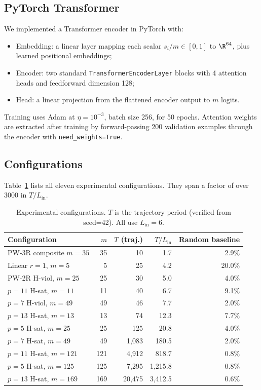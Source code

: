 \documentclass[11pt]{article}
\theoremstyle{plain}
\theoremstyle{definition}
\begin{document}
\subsection{PyTorch Transformer}

We implemented a Transformer encoder in PyTorch with:
\begin{itemize}[leftmargin=2em,itemsep=2pt]
  \item Embedding: a linear layer mapping each scalar $s_i/m \in [0,1]$ to $\R^{64}$, plus learned positional embeddings;
  \item Encoder: two standard \texttt{TransformerEncoderLayer} blocks with 4 attention heads and feedforward dimension 128;
  \item Head: a linear projection from the flattened encoder output to $m$ logits.
\end{itemize}
Training uses Adam at $\eta = 10^{-3}$, batch size 256, for 50 epochs. Attention weights are extracted after training by forward-passing 200 validation examples through the encoder with \texttt{need\_weights=True}.

\subsection{Configurations}

Table~\ref{tab:configs} lists all eleven experimental configurations. They span a factor of over 3000 in $T/L_{\mathrm{in}}$.

\begin{table}[ht]
\centering
\caption{Experimental configurations. $T$ is the trajectory period (verified from seed=42). All use $L_{\mathrm{in}}=6$.}
\label{tab:configs}
\medskip
\begin{tabular}{@{}lrrrr@{}}
\toprule
Configuration & $m$ & $T$ (traj.) & $T/L_{\mathrm{in}}$ & Random baseline\\
\midrule
PW-3R composite $m=35$           & 35  & 10           & 1.7      & 2.9\%\\
Linear $r=1$, $m=5$              & 5   & 25           & 4.2      & 20.0\%\\
PW-2R H-viol, $m=25$             & 25  & 30           & 5.0      & 4.0\%\\
$p=11$ H-sat, $m=11$             & 11  & 40           & 6.7      & 9.1\%\\
$p=7$ H-viol, $m=49$             & 49  & 46           & 7.7      & 2.0\%\\
$p=13$ H-sat, $m=13$             & 13  & 74           & 12.3     & 7.7\%\\
$p=5$ H-sat, $m=25$              & 25  & 125          & 20.8     & 4.0\%\\
\midrule
$p=7$ H-sat, $m=49$              & 49  & 1{,}083       & 180.5    & 2.0\%\\
$p=11$ H-sat, $m=121$            & 121 & 4{,}912       & 818.7    & 0.8\%\\
$p=5$ H-sat, $m=125$             & 125 & 7{,}295       & 1{,}215.8 & 0.8\%\\
$p=13$ H-sat, $m=169$            & 169 & 20{,}475      & 3{,}412.5 & 0.6\%\\
\bottomrule
\end{tabular}
\end{table}
\end{document}
